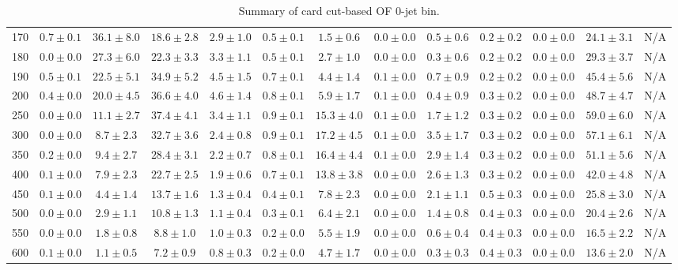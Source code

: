 \begin{table}
{\begin{center}
\begin{tabular}{l | c c | c c c c c c c c  | c c}
170 & $0.7\pm0.1$ & $36.1\pm8.0$ & $18.6\pm2.8$ & $2.9\pm1.0$ & $0.5\pm0.1$ & $1.5\pm0.6$ & $0.0\pm0.0$ & $0.5\pm0.6$ & $0.2\pm0.2$ & $0.0\pm0.0$ & $24.1\pm3.1$ & N/A \\
180 & $0.0\pm0.0$ & $27.3\pm6.0$ & $22.3\pm3.3$ & $3.3\pm1.1$ & $0.5\pm0.1$ & $2.7\pm1.0$ & $0.0\pm0.0$ & $0.3\pm0.6$ & $0.2\pm0.2$ & $0.0\pm0.0$ & $29.3\pm3.7$ & N/A \\
190 & $0.5\pm0.1$ & $22.5\pm5.1$ & $34.9\pm5.2$ & $4.5\pm1.5$ & $0.7\pm0.1$ & $4.4\pm1.4$ & $0.1\pm0.0$ & $0.7\pm0.9$ & $0.2\pm0.2$ & $0.0\pm0.0$ & $45.4\pm5.6$ & N/A \\
200 & $0.4\pm0.0$ & $20.0\pm4.5$ & $36.6\pm4.0$ & $4.6\pm1.4$ & $0.8\pm0.1$ & $5.9\pm1.7$ & $0.1\pm0.0$ & $0.4\pm0.9$ & $0.3\pm0.2$ & $0.0\pm0.0$ & $48.7\pm4.7$ & N/A \\
250 & $0.0\pm0.0$ & $11.1\pm2.7$ & $37.4\pm4.1$ & $3.4\pm1.1$ & $0.9\pm0.1$ & $15.3\pm4.0$ & $0.1\pm0.0$ & $1.7\pm1.2$ & $0.3\pm0.2$ & $0.0\pm0.0$ & $59.0\pm6.0$ & N/A \\
300 & $0.0\pm0.0$ & $8.7\pm2.3$ & $32.7\pm3.6$ & $2.4\pm0.8$ & $0.9\pm0.1$ & $17.2\pm4.5$ & $0.1\pm0.0$ & $3.5\pm1.7$ & $0.3\pm0.2$ & $0.0\pm0.0$ & $57.1\pm6.1$ & N/A \\
350 & $0.2\pm0.0$ & $9.4\pm2.7$ & $28.4\pm3.1$ & $2.2\pm0.7$ & $0.8\pm0.1$ & $16.4\pm4.4$ & $0.1\pm0.0$ & $2.9\pm1.4$ & $0.3\pm0.2$ & $0.0\pm0.0$ & $51.1\pm5.6$ & N/A \\
400 & $0.1\pm0.0$ & $7.9\pm2.3$ & $22.7\pm2.5$ & $1.9\pm0.6$ & $0.7\pm0.1$ & $13.8\pm3.8$ & $0.0\pm0.0$ & $2.6\pm1.3$ & $0.3\pm0.2$ & $0.0\pm0.0$ & $42.0\pm4.8$ & N/A \\
450 & $0.1\pm0.0$ & $4.4\pm1.4$ & $13.7\pm1.6$ & $1.3\pm0.4$ & $0.4\pm0.1$ & $7.8\pm2.3$ & $0.0\pm0.0$ & $2.1\pm1.1$ & $0.5\pm0.3$ & $0.0\pm0.0$ & $25.8\pm3.0$ & N/A \\
500 & $0.0\pm0.0$ & $2.9\pm1.1$ & $10.8\pm1.3$ & $1.1\pm0.4$ & $0.3\pm0.1$ & $6.4\pm2.1$ & $0.0\pm0.0$ & $1.4\pm0.8$ & $0.4\pm0.3$ & $0.0\pm0.0$ & $20.4\pm2.6$ & N/A \\
550 & $0.0\pm0.0$ & $1.8\pm0.8$ & $8.8\pm1.0$ & $1.0\pm0.3$ & $0.2\pm0.0$ & $5.5\pm1.9$ & $0.0\pm0.0$ & $0.6\pm0.4$ & $0.4\pm0.3$ & $0.0\pm0.0$ & $16.5\pm2.2$ & N/A \\
600 & $0.1\pm0.0$ & $1.1\pm0.5$ & $7.2\pm0.9$ & $0.8\pm0.3$ & $0.2\pm0.0$ & $4.7\pm1.7$ & $0.0\pm0.0$ & $0.3\pm0.3$ & $0.4\pm0.3$ & $0.0\pm0.0$ & $13.6\pm2.0$ & N/A \\
\hline
\end{tabular}
\end{center}
}
\caption{Summary of card cut-based OF 0-jet bin.}
\end{table}
